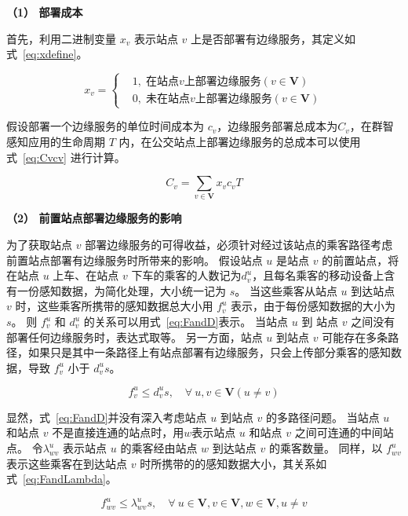 \textbf{（1） 部署成本}

首先，利用二进制变量 $x_v$ 表示站点 $v$ 上是否部署有边缘服务，其定义如式~\eqref{eq:xdefine}。

\begin{equation}
\label{eq:xdefine}
x_v =\left\{
\begin{aligned}
&1, \; 在站点 v 上部署边缘服务 (v\in \boldsymbol{V})\\
&0, \; 未在站点 v 上部署边缘服务 (v\in \boldsymbol{V})
\end{aligned}
\right.
\end{equation}

假设部署一个边缘服务的单位时间成本为 $c_v$，边缘服务部署总成本为$C_v$，在群智感知应用的生命周期 $T$ 内，在公交站点上部署边缘服务的总成本可以使用式~\eqref{eq:Cvcv} 进行计算。

\begin{equation}
\label{eq:Cvcv}
C_v = \sum_{v\in \boldsymbol{V}}x_v c_v T
\end{equation}

\textbf{（2） 前置站点部署边缘服务的影响}

为了获取站点 $v$ 部署边缘服务的可得收益，必须针对经过该站点的乘客路径考虑前置站点部署有边缘服务时所带来的影响。
假设站点 $u$ 是站点 $v$ 的前置站点，将在站点 $u$ 上车、在站点 $v$ 下车的乘客的人数记为$d^u_v$，且每名乘客的移动设备上含有一份感知数据，为简化处理，大小统一记为 $s$。
当这些乘客从站点 $u$ 到达站点 $v$ 时，这些乘客所携带的感知数据总大小用 $f^u_v$ 表示，由于每份感知数据的大小为 $s$。
则 $f^u_v$ 和 $d^u_v$ 的关系可以用式~\eqref{eq:FandD}表示。
当站点 $u$ 到 站点 $v$ 之间没有部署任何边缘服务时，表达式取等。
另一方面，站点 $u$ 到站点 $v$ 可能存在多条路径，如果只是其中一条路径上有站点部署有边缘服务，只会上传部分乘客的感知数据，导致 $f^u_v$ 小于 $d^u_v s$。

\begin{equation}
\label{eq:FandD}
f^u_v \leq d^u_v s, \quad \forall \ u, v\in \boldsymbol{V} (u \neq v)
\end{equation}

显然，式~\eqref{eq:FandD}并没有深入考虑站点 $u$ 到站点 $v$ 的多路径问题。
当站点 $u$ 和站点 $v$ 不是直接连通的站点时，用$w$表示站点 $u$ 和站点 $v$ 之间可连通的中间站点。
令$\lambda^u_{wv}$ 表示站点 $u$ 的乘客经由站点 $w$ 到达站点 $v$ 的乘客数量。
同样，以 $f^u_{wv}$ 表示这些乘客在到达站点 $v$ 时所携带的的感知数据大小，其关系如式~\eqref{eq:FandLambda}。

\begin{equation}
\label{eq:FandLambda}
f^u_{wv} \leq \lambda^u_{wv} s, \quad \forall \  u \in \boldsymbol{V}, v \in \boldsymbol{V}, w \in \boldsymbol{V}, u \neq v
\end{equation}

